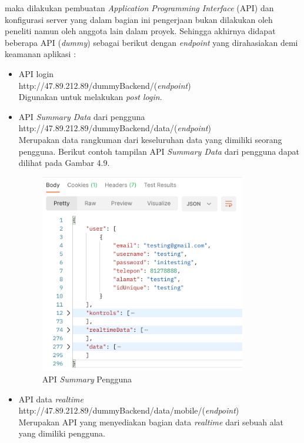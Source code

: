 \begin{flushleft}
\begin{justify}
        maka dilakukan pembuatan \emph{Application Programming Interface} (API) dan konfigurasi server yang dalam bagian ini 
        pengerjaan bukan dilakukan oleh peneliti namun oleh anggota lain dalam proyek. 
        Sehingga akhirnya didapat beberapa API (\emph{dummy}) sebagai berikut dengan \emph{endpoint} yang dirahasiakan demi keamanan aplikasi :
            \begin{itemize}
                \item API login\\
                http://47.89.212.89/dummyBackend/(\emph{endpoint})
                \\Digunakan untuk melakukan \emph{post login}.
                \item API \emph{Summary Data} dari pengguna\\
                http://47.89.212.89/dummyBackend/data/(\emph{endpoint})\\
                Merupakan data rangkuman dari keseluruhan data yang dimiliki seorang pengguna. 
                Berikut contoh tampilan API
                \emph{Summary Data} dari pengguna dapat dilihat pada Gambar 4.9.
                \begin{figure}[ht]
                    \centering
                    \includegraphics[width=9cm]{images/bab 4/api/summary.png}
                    \caption{API \textit{Summary} Pengguna}
                \end{figure}
                \item API data \emph{realtime}\\
                http://47.89.212.89/dummyBackend/data/mobile/(\emph{endpoint})\\
                Merupakan API yang menyediakan bagian data \emph{realtime} dari sebuah alat yang dimiliki pengguna.

\end{itemize}
\end{justify}
\end{flushleft}
